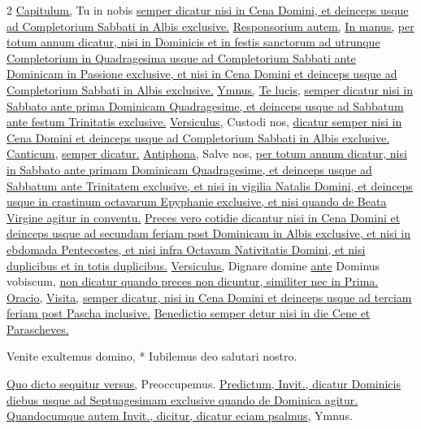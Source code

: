 \begin{multicols*}{2}
\newline \ul{Capitulum,} Tu in nobis \ul{semper dicatur nisi in Cena Domini, et deinceps usque ad Completorium Sabbati in Albis exclusive.}
\newline \ul{Responsorium autem,} \hyperlink{in-manus-tuas-breve}{In manus,} \ul{per totum annum dicatur, nisi in Dominicis et in festis sanctorum ad utrunque Completorium in Quadragesima usque ad Completorium Sabbati ante Dominicam in Passione exclusive, et nisi in Cena Domini et deinceps usque ad Completorium Sabbati in Albis exclusive.}
\newline \ul{Ymnus,} \hyperlink{te-lucis}{Te lucis,} \ul{semper dicatur nisi in Sabbato ante prima Dominicam Quadragesime, et deinceps usque ad Sabbatum ante festum Trinitatis exclusive.}
\newline \ul{Versiculus,} Custodi nos, \ul{dicatur semper nisi in Cena Domini et deinceps usque ad Completorium Sabbati in Albis exclusive.}
\newline \ul{Canticum,}  \ul{semper dicatur.}
\newline \ul{Antiphona,} Salve nos, \ul{per totum annum dicatur, nisi in Sabbato ante primam Dominicam Quadragesime, et deinceps usque ad Sabbatum ante Trinitatem exclusive, et nisi in vigilia Natalis Domini, et deinceps usque in crastinum octavarum Epyphanie exclusive, et nisi quando de Beata Virgine agitur in conventu.}
\newline \ul{Preces vero cotidie dicantur nisi in Cena Domini et deinceps usque ad secundam feriam post Dominicam in Albis exclusive, et nisi in ebdomada Pentecostes, et nisi infra Octavam Nativitatis Domini, et nisi duplicibus et in totis duplicibus.}
\newline \ul{Versiculus,} Dignare domine \ul{ante} Dominus vobiscum, \ul{non dicatur quando preces non dicuntur, similiter nec in Prima.}
\newline \ul{Oracio,} \hyperlink{visita-quesumus}{Visita,} \ul{semper dicatur, nisi in Cena Domini et deinceps usque ad terciam feriam post Pascha inclusive.}
\newline \ul{Benedictio semper detur nisi in die Cene et Parascheves.}
\begin{invitatory}
{Venite exultemus domino, * Iubilemus deo salutari nostro.}
\end{invitatory}
\ul{Quo dicto sequitur versus,} Preoccupemus. \ul{Predictum, Invit., dicatur Dominicis diebus usque ad Septuagesimam exclusive quando de Dominica agitur. Quandocumque autem Invit., dicitur, dicatur eciam psalmus,}  {\color{Red} Ymnus.}

\end{multicols*}
